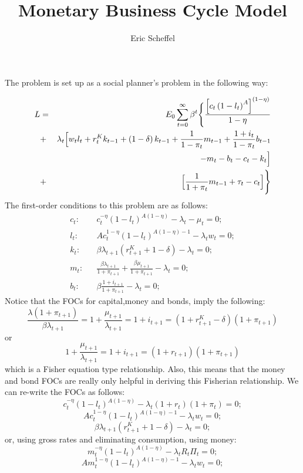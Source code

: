\documentclass[a4paper,11pt]{article}
\title{Monetary Business Cycle Model}
\author{Eric Scheffel}
\begin{document}
\maketitle


The problem is set up as a social planner's problem in the following way:

\begin{eqnarray*}
L & = & E_0\sum_{t=0}^\infty\beta^t\Biggl\lbrace\frac{\left[c_t\left(1-l_t\right)^A\right]^{\left(1-\eta\right)}}{1-\eta}\\
  & + & \lambda_t\Bigl[w_tl_t+r_t^Kk_{t-1}+\left(1-\delta\right)k_{t-1}+\frac{1}{1-\pi_t}m_{t-1}+\frac{1+i_t}{1-\pi_t}b_{t-1}\\
  &   & -m_t-b_t-c_t-k_t\Bigr]\\
  & + & \Bigl[\frac{1}{1+\pi_t}m_{t-1}+\tau_t-c_t\Bigr]\Biggr\rbrace
\end{eqnarray*}
The first-order conditions to this problem are as follows:
\begin{eqnarray*}
c_t: & & c_t^{-\eta}\left(1-l_t\right)^{A\left(1-\eta\right)}-\lambda_t-\mu_t = 0;\\
l_t: & & Ac_t^{1-\eta}\left(1-l_t\right)^{A\left(1-\eta\right)-1}-\lambda_tw_t = 0;\\
k_t: & & \beta\lambda_{t+1}\left(r_{t+1}^K+1-\delta\right)-\lambda_t = 0;\\
m_t: & & \frac{\beta\lambda_{t+1}}{1+\pi_{t+1}}+\frac{\beta\mu_{t+1}}{1+\pi_{t+1}}-\lambda_t = 0;\\
b_t: & & \beta\frac{1+i_{t+1}}{1+\pi_{t+1}}-\lambda_t = 0;
\end{eqnarray*}
Notice that the FOCs for capital,money and bonds, imply the following:
\[\frac{\lambda\left(1+\pi_{t+1}\right)}{\beta\lambda_{t+1}}=1+\frac{\mu_{t+1}}{\lambda_{t+1}}=1+i_{t+1}=\left(1+r_{t+1}^K-\delta\right)\left(1+\pi_{t+1}\right)\]
or
\[1+\frac{\mu_{t+1}}{\lambda_{t+1}}=1+i_{t+1}=\left(1+r_{t+1}\right)\left(1+\pi_{t+1}\right)\]
which is a Fisher equation type relationship. Also, this means that the money and bond FOCs are really only helpful
in deriving this Fisherian relationship. We can re-write the FOCs as follows:
\[c_t^{-\eta}\left(1-l_t\right)^{A\left(1-\eta\right)}-\lambda_t\left(1+r_t\right)\left(1+\pi_t\right) = 0;\]
\[Ac_t^{1-\eta}\left(1-l_t\right)^{A\left(1-\eta\right)-1}-\lambda_tw_t = 0;\]
\[\beta\lambda_{t+1}\left(r_{t+1}^K+1-\delta\right)-\lambda_t = 0;\]
or, using gross rates and eliminating consumption, using money:
\[m_t^{-\eta}\left(1-l_t\right)^{A\left(1-\eta\right)}-\lambda_tR_t\Pi_t = 0;\]
\[Am_t^{1-\eta}\left(1-l_t\right)^{A\left(1-\eta\right)-1}-\lambda_tw_t = 0;\]
\end{document}
